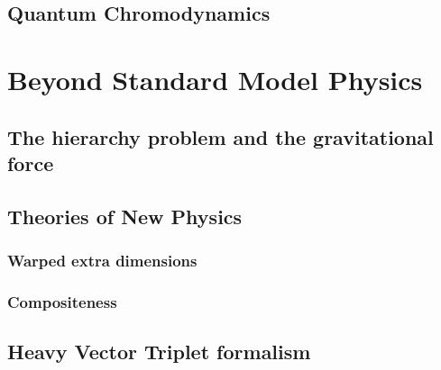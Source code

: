 \subsection{Quantum Chromodynamics}
\label{sec:theory:qcd}
\section{Beyond Standard Model Physics}
\subsection{The hierarchy problem and the gravitational force}
\subsection{Theories of New Physics}
\subsubsection{Warped extra dimensions}
\label{sec:theory:wed}
\subsubsection{Compositeness}
\subsection{Heavy Vector Triplet formalism}
\label{sec:theory:hvt}
